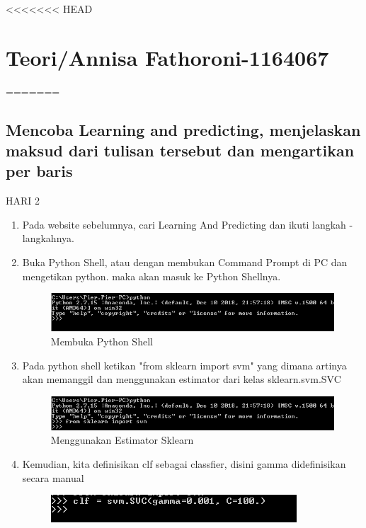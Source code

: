 <<<<<<< HEAD


\section{Teori/Annisa Fathoroni-1164067}
=======
\subsection{Mencoba Learning and predicting, menjelaskan maksud dari tulisan tersebut dan mengartikan per baris}
HARI 2

\begin{enumerate}
\item
Pada website sebelumnya, cari Learning And Predicting dan ikuti langkah -langkahnya.
\item
Buka Python Shell, atau dengan membukan Command Prompt di PC dan mengetikan python. maka akan masuk ke Python Shellnya.
\begin{figure}
	\begin{center}
   	 \includegraphics[scale=1]{figures/tasya1.png}
   	 \caption{Membuka Python Shell}	
	\end{center}
\end{figure}
\item
Pada python shell ketikan "from sklearn import svm" yang dimana artinya akan memanggil dan menggunakan estimator dari kelas sklearn.svm.SVC
\begin{figure}
	\begin{center}
   	 \includegraphics[scale=1]{figures/tasya2.png}
   	 \caption{Menggunakan Estimator Sklearn }	
	\end{center}
\end{figure}
\item
Kemudian, kita definisikan clf sebagai classfier, disini gamma didefinisikan secara manual
\begin{figure}
	\begin{center}
   	 \includegraphics[scale=1]{figures/tasya3.png}

\end{center}
\end{figure}
\end{enumerate}
